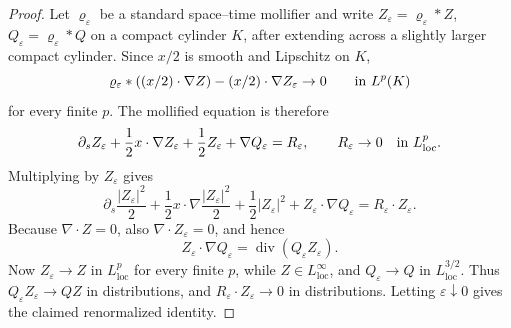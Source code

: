 \documentclass[11pt]{amsart}
\numberwithin{equation}{section}
\theoremstyle{plain}
\theoremstyle{definition}
\theoremstyle{remark}
\newcommand{\loc}{\mathrm{loc}}
\newcommand{\divergence}{\operatorname{div}}
\begin{document}
\begin{proof}
Let \(\varrho_\varepsilon\) be a standard space--time mollifier and write
\(Z_\varepsilon=\varrho_\varepsilon*Z\), \(Q_\varepsilon=\varrho_\varepsilon*Q\)
on a compact cylinder \(K\), after extending across a slightly larger compact
cylinder.  Since \(x/2\) is smooth and Lipschitz on \(K\),
\[
   \varrho_\varepsilon*((x/2)\cdot\nabla Z)
   -(x/2)\cdot\nabla Z_\varepsilon\to0
   \qquad\hbox{in }L^p(K)
\]
for every finite \(p\).  The mollified equation is therefore
\[
   \partial_s Z_\varepsilon+\frac12x\cdot\nabla Z_\varepsilon
   +\frac12Z_\varepsilon+\nabla Q_\varepsilon=R_\varepsilon,
   \qquad R_\varepsilon\to0\quad\hbox{in }L^p_{\loc}.
\]
Multiplying by \(Z_\varepsilon\) gives
\[
   \partial_s\frac{|Z_\varepsilon|^2}{2}
   +\frac12x\cdot\nabla\frac{|Z_\varepsilon|^2}{2}
   +\frac12|Z_\varepsilon|^2
   +Z_\varepsilon\cdot\nabla Q_\varepsilon
   =R_\varepsilon\cdot Z_\varepsilon .
\]
Because \(\nabla\cdot Z=0\), also \(\nabla\cdot Z_\varepsilon=0\), and hence
\[
   Z_\varepsilon\cdot\nabla Q_\varepsilon
   =\divergence(Q_\varepsilon Z_\varepsilon).
\]
Now \(Z_\varepsilon\to Z\) in \(L^p_{\loc}\) for every finite \(p\), while
\(Z\in L^\infty_{\loc}\), and \(Q_\varepsilon\to Q\) in
\(L^{3/2}_{\loc}\).  Thus \(Q_\varepsilon Z_\varepsilon\to QZ\) in
distributions, and \(R_\varepsilon\cdot Z_\varepsilon\to0\) in distributions.
Letting \(\varepsilon\downarrow0\) gives the claimed renormalized identity.
\end{proof}
\end{document}

